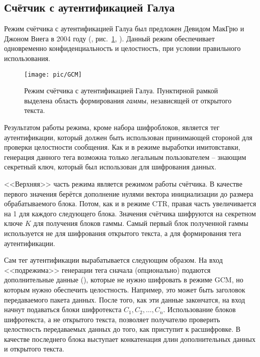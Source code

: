 \subsection{Счётчик с аутентификацией Галуа}

Режим счётчика с аутентификацией Галуа был предложен Девидом МакГрю и Джоном Виега в 2004 году (, рис.~\ref{fig:GCM}, \cite{McGrew:Viega:2004}). Данный режим обеспечивает одновременно конфиденциальность и целостность, при условии правильного использования.

\begin{figure}[bt]
	\centering
	\texttt{[image: pic/GCM]}
	\caption{Режим счётчика с аутентификацией Галуа. Пунктирной рамкой выделена область формирования \emph{гаммы}, независящей от открытого текста.}
	\label{fig:GCM}
\end{figure}

Результатом работы режима, кроме набора шифроблоков, является тег аутентификации, который должен быть использован принимающей стороной для проверки целостности сообщения. Как и в режиме выработки имитовставки, генерация данного тега возможна только легальным пользователем -- знающим секретный ключ, который был использован для шифрования данных.

<<Верхняя>> часть режима является режимом работы счётчика. В качестве первого значения берётся дополнение нулями вектора инициализации до размера обрабатываемого блока. Потом, как и в режиме CTR, правая часть увеличивается на 1 для каждого следующего блока. Значения счётчика шифруются на секретном ключе $K$ для получения блоков гаммы. Самый первый блок полученной гаммы используется не для шифрования открытого текста, а для формирования тега аутентификации.

Сам тег аутентификации вырабатывается следующим образом. На вход <<подрежима>> генерации тега сначала (опционально) подаются дополнительные данные (), которые не нужно шифровать в режиме GCM, но которым нужно обеспечить целостность. Например, это может быть заголовок передаваемого пакета данных. После того, как эти данные закончатся, на вход начнут подаваться блоки шифротекста $C_1, C_2, \dots, C_n$. Использование блоков шифротекста, а не открытого текста, позволяет получателю проверить целостность передаваемых данных до того, как приступит к расшифровке. В качестве последнего блока выступает конкатенация длин дополнительных данных и открытого текста.

